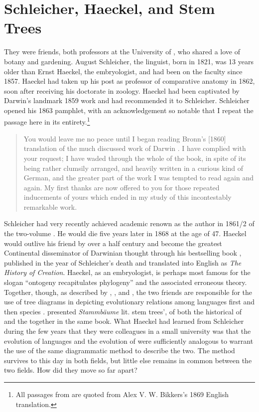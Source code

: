 \documentclass[output=paper,
modfonts
]{LSP/langsci}
\begin{document}
\section{Schleicher, Haeckel, and Stem Trees}

They were friends, both professors at the University of , who shared a love of botany and gardening.  August Schleicher, the linguist, born in 1821, was 13 years older than Ernst Haeckel, the embryologist, and had been on the faculty since 1857. Haeckel had taken up his post as professor of comparative anatomy in 1862, soon after receiving his doctorate in zoology. Haeckel had been captivated by Darwin's landmark 1859 work and had recommended it to Schleicher. Schleicher opened his 1863 pamphlet,  with an acknowledgement so notable that I repeat the passage here in its entirety.\footnote{All passages from \citet{Schleicher1863} are quoted from Alex V. W. Bikkers's 1869 English translation.}

\begin{quote}
You would leave me no peace until I began reading Bronn's [1860] translation of the much discussed work of Darwin . I have complied with your request; I have waded through the whole of the book, in spite of its being rather clumsily arranged, and heavily written in a curious kind of German, and the greater part of the work I was tempted to read again and again. My first thanks are now offered to you for those repeated inducements of yours which ended in my study of this incontestably remarkable work. \citep[13--14]{Darwin1859}
\end{quote}

Schleicher had very recently achieved academic renown as the author in 1861/2 of the two-volume . He would die five years later in 1868 at the age of 47.  Haeckel would outlive his friend by over a half century and become the greatest Continental disseminator of Darwinian thought through his bestselling book , published in the year of Schleicher's death and translated into English as \textit{The History of Creation}. Haeckel, as an embryologist, is perhaps most famous for the slogan ``ontogeny recapitulates phylogeny'' and the associated erroneous theory. Together, though, as described by \citet{Burrow1972}, \citet{O'Hara1996}, and \citet{gontier2011}, the two friends are responsible for the use of tree diagrams in depicting evolutionary relations among languages first \citep{Schleicher1861,Schleicher1863} and then species \citep{Haeckel1866}. \citet{Haeckel1874} presented \textit{Stammbäume} lit. stem trees', of both the historical  of  and the  together in the same book.  What Haeckel had learned from Schleicher during the few years that they were colleagues in a small university was that the evolution of languages and the evolution of  were sufficiently analogous to warrant the use of the same diagrammatic method to describe the two. The method survives to this day in both fields, but little else remains in common between the two fields.  How did they move so far apart?
\end{document}

